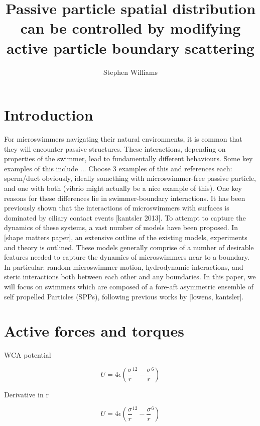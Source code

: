 \documentclass{article}
\title{Passive particle spatial distribution can be controlled by modifying active particle boundary scattering}
\author{Stephen Williams}
\begin{document}
\maketitle


\section{Introduction}

For microswimmers navigating their natural environments, it is common that they will encounter passive structures. %
These interactions, depending on properties of the swimmer, lead to fundamentally different behaviours.
Some key examples of this include ... Choose 3 examples of this and references each: sperm/duct obviously, ideally something with microswimmer-free passive particle, and one with both (vibrio might actually be a nice example of this).
One key reasons for these differences lie in swimmer-boundary interactions.
It has been previously shown that the interactions of microswimmers with surfaces is dominated by ciliary contact events [kantsler 2013].
To attempt to capture the dynamics of these systems, a vast number of models have been proposed.
In [shape matters paper], an extensive outline of the existing models, experiments and theory is outlined.
These models generally comprise of a number of desirable features needed to capture the dynamics of microswimmers near to a boundary. 
In particular: random microswimmer motion, hydrodynamic interactions, and steric interactions both between each other and any boundaries.
In this paper, we will focus on swimmers which are composed of a fore-aft asymmetric ensemble of self propelled Particles (SPPs), following previous works by [lowens, kantsler].

\section{Active forces and torques}

WCA potential

\begin{equation} 
U = 4\epsilon \left( \frac{\sigma}{r}^12 - \frac{\sigma}{r}^6 \right)
\end{equation}

Derivative in r

\begin{equation} 
U = 4\epsilon \left( \frac{\sigma}{r}^12 - \frac{\sigma}{r}^6 \right)
\end{equation}
\end{document}
